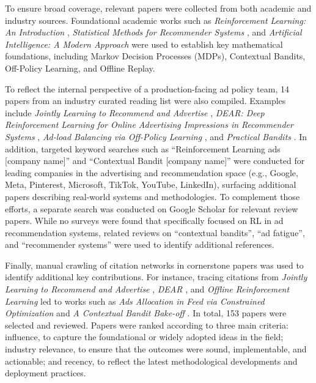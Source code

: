 \documentclass[manuscript,review,screen]{acmart}
\begin{document}
To ensure broad coverage, relevant papers were collected from both academic and industry sources. Foundational academic works such as \textit{Reinforcement Learning: An Introduction} \cite{Sutton1998}, \textit{Statistical Methods for Recommender Systems} \cite{agarwal2016statistical}, and \textit{Artificial Intelligence: A Modern Approach} \cite{russell2016artificial} were used to establish key mathematical foundations, including Markov Decision Processes (MDPs), Contextual Bandits, Off-Policy Learning, and Offline Replay.

To reflect the internal perspective of a production-facing ad policy team, 14 papers from an industry curated reading list were also compiled. Examples include \textit{Jointly Learning to Recommend and Advertise} \cite{zhao2020jointly}, \textit{DEAR: Deep Reinforcement Learning for Online Advertising Impressions in Recommender Systems} \cite{zhao2021dear}, \textit{Ad-load Balancing via Off-Policy Learning} \cite{sagtani2024ad}, and \textit{Practical Bandits} \cite{van2024practical}. In addition, targeted keyword searches such as ``Reinforcement Learning ads [company name]'' and ``Contextual Bandit [company name]'' were conducted for leading companies in the advertising and recommendation space (e.g., Google, Meta, Pinterest, Microsoft, TikTok, YouTube, LinkedIn), surfacing additional papers describing real-world systems and methodologies. To complement those efforts, a separate search was conducted on Google Scholar for relevant review papers. While no surveys were found that specifically focused on RL in ad recommendation systems, related reviews on ``contextual bandits'', ``ad fatigue'', and ``recommender systems'' were used to identify additional references.

Finally, manual crawling of citation networks in cornerstone papers was used to identify additional key contributions. For instance, tracing citations from \textit{Jointly Learning to Recommend and Advertise} \cite{zhao2020jointly}, \textit{DEAR} \cite{zhao2021dear}, and \textit{Offline Reinforcement Learning} \cite{levine2020offline} led to works such as \textit{Ads Allocation in Feed via Constrained Optimization} \cite{yan2020ads} and \textit{A Contextual Bandit Bake-off} \cite{bietti2021contextual}.
In total, 153 papers were selected and reviewed. Papers were ranked according to three main criteria: influence, to capture the foundational or widely adopted ideas in the field; industry relevance, to ensure that the outcomes were sound, implementable, and actionable; and recency, to reflect the latest methodological developments and deployment practices.
\end{document}
